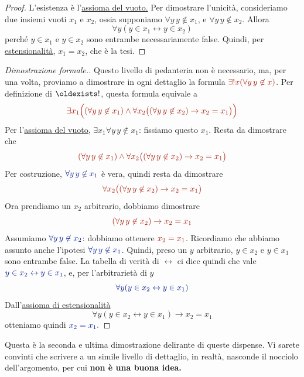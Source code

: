 \begin{proof}
L'esistenza \`e l'\hyperref[ax1]{assioma del vuoto.} Per dimostrare
l'unicit\`a,
consideriamo due insiemi vuoti $x_1$ e $x_2$, ossia supponiamo $\forall y \, y \not\in x_1$, e $\forall y \, y \not \in x_2$. Allora
\[ \forall y (y \in x_1 \leftrightarrow y \in x_2) \]
perch\'e $y \in x_1$ e $y \in x_2$ sono entrambe necessariamente false.
Quindi, per \hyperref[ax2]{estensionalit\`a,} $x_1 = x_2$, che \`e la tesi.
\end{proof}

\begin{proof}[Dimostrazione formale.] Questo livello di pedanteria non \`e
necessario, ma, per una volta, proviamo a dimostrare in ogni dettaglio la
formula $\drkred \exists ! x (\forall y \, y \not \in x)$. Per definizione di
$\oldexists!$, questa formula equivale a
\[\drkred  \exists {x_1} \Bigl((\forall y \, y \not \in x_1) \land
\forall {x_2} \bigl((\forall y \, y \not \in x_2) \rightarrow x_2 =
x_1\bigr)\Bigr)
	\]
Per l'\hyperref[ax1]{assioma del vuoto,} $\exists {x_1} \forall y \, y \not \in x_1$: fissiamo questo $x_1$. Resta da dimostrare che
\[ \drkred (\forall y \, y \not \in x_1) \land \forall {x_2} \bigl((\forall y \, y
\not \in x_2) \rightarrow x_2 = x_1\bigr) \]
Per costruzione, $\drkblu \forall y\,  y \not\in x_1$ \`e vera, quindi resta da
dimostrare
\[ \drkred \forall {x_2} \bigl((\forall y \, y \not \in x_2) \rightarrow x_2 =
x_1\bigr) \]
Ora prendiamo un $x_2$ arbitrario, dobbiamo dimostrare
\[ \drkred (\forall y \, y \not \in x_2) \rightarrow x_2 =  x_1 \]
Assumiamo $\drkblu \forall y\, y \not \in x_2$: dobbiamo ottenere $\drkred x_2 =x_1$.
Ricordiamo che abbiamo assunto anche l'ipotesi $\drkblu \forall y\, y \not \in x_1$. Quindi, preso un
$y$ arbitrario, $y \in x_2$ e $y \in x_1$ sono entrambe false. La tabella
di verit\`a di $\leftrightarrow$ ci dice quindi che vale $\drkblu y \in x_2 \leftrightarrow y \in x_1$, e, per 
l'arbitrariet\`a di $y$
\[ \drkblu \forall y (y \in x_2 \leftrightarrow y \in x_1)
	\]
Dall'\hyperref[ax2]{assioma di estensionalit\`a}
\[ \forall y (y \in x_2 \leftrightarrow y \in x_1) \rightarrow x_2 = x_1
	\]
otteniamo quindi $\drkblu x_2 = x_1.$
\end{proof}

\begin{note}
Questa \`e la seconda e ultima dimostrazione delirante di queste dispense.
Vi sarete convinti che scrivere a un simile livello di dettaglio, in
realt\`a, nasconde il nocciolo dell'argomento, per cui \textbf{non \`e una buona idea.}
\end{note}

